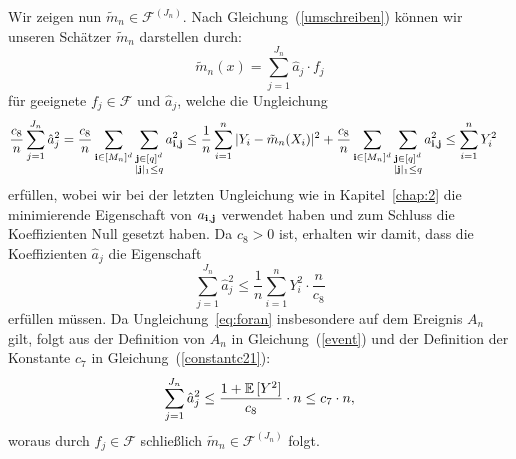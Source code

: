 Wir zeigen nun $\tilde{m}_n \in \mathcal{F}^{(J_n)}$.
Nach Gleichung~(\ref{umschreiben}) können wir unseren Schätzer $\tilde{m}_n$ darstellen durch:
$$\tilde{m}_n(x) = \sum_{j = 1}^{J_n}\hat{a}_j \cdot f_j$$
für geeignete $f_j \in \mathcal{F}$ und $\hat{a}_j$, welche die Ungleichung
\begin{equation*}
\begin{split}
\frac{c_8}{n}\sum_{j = 1}^{J_n} \hat{a}_j^2 & = \frac{c_8}{n} \sum_{\mathbf{i} \in [M_n]^d} \sum_{\substack{\mathbf{j} \in [q]^d \\ |\mathbf{j}|_1 \leq q}} a_{\mathbf{i},\mathbf{j}}^2
\leq \frac{1}{n} \sum_{i = 1}^n|Y_i - \tilde{m}_n(X_i)|^2 + \frac{c_8}{n} \sum_{\mathbf{i} \in [M_n]^d} \sum_{\substack{\mathbf{j} \in [q]^d \\ |\mathbf{j}|_1 \leq q}} a_{\mathbf{i},\mathbf{j}}^2 
\leq \sum_{i = 1}^n Y_i^2
\end{split}
\end{equation*}
erfüllen, wobei wir bei der letzten Ungleichung wie in Kapitel~\ref{chap:2} die minimierende Eigenschaft von $a_{\mathbf{i},\mathbf{j}}$ verwendet haben und zum Schluss die Koeffizienten Null gesetzt haben. Da $c_8 > 0$ ist, erhalten wir damit, dass die Koeffizienten $\hat{a}_j$ die Eigenschaft
\begin{equation}
\label{eq:foran}
\sum_{j = 1}^{J_n} \hat{a}_j^2  \leq \frac{1}{n}\sum_{i = 1}^n Y_i^2 \cdot \frac{n}{c_8}
\end{equation}
erfüllen müssen.
Da Ungleichung~\eqref{eq:foran} insbesondere auf dem Ereignis $A_n$ gilt, folgt aus der Definition von $A_n$ in Gleichung~(\ref{event}) und der Definition der Konstante $c_7$ in Gleichung~(\ref{constantc21}):
$$\sum_{j = 1}^{J_n}\hat{a}_j^2 \leq \frac{1 + \mathbb{E}\,[Y^2]}{c_8} \cdot n \leq c_7 \cdot n,$$
woraus durch $f_j \in \mathcal{F}$ schließlich $\tilde{m}_n \in \mathcal{F}^{(J_n)}$ folgt.


